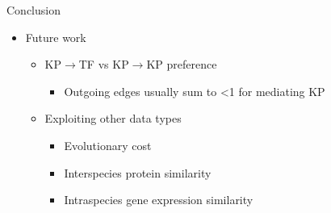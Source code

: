 \begin{frame}{Conclusion}
\begin{itemize}
    \item Future work
    \begin{itemize}
        \item KP$\rightarrow$TF vs KP$\rightarrow$KP preference
        \begin{itemize}
            \item Outgoing edges usually sum to <1 for mediating KP
        \end{itemize}
    \item Exploiting other data types
        \begin{itemize}
            \item Evolutionary cost
            \item Interspecies protein similarity 
            \item Intraspecies gene expression similarity 

\end{itemize}
\end{itemize}
\end{itemize}
\end{frame}
